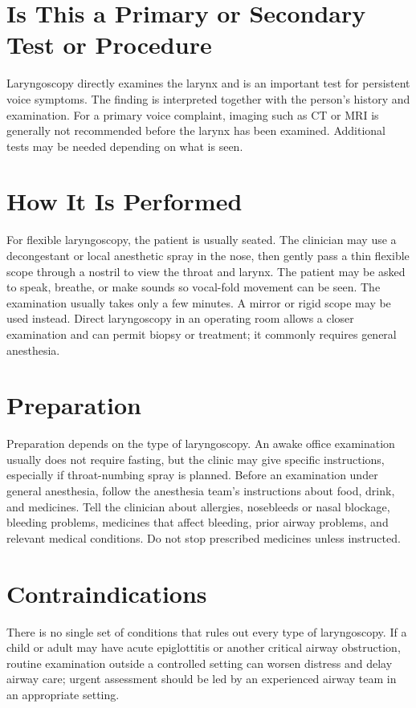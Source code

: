 \section*{Is This a Primary or Secondary Test or Procedure}
Laryngoscopy directly examines the larynx and is an important test for persistent voice symptoms. The finding is interpreted together with the person's history and examination. For a primary voice complaint, imaging such as CT or MRI is generally not recommended before the larynx has been examined. Additional tests may be needed depending on what is seen.

\section*{How It Is Performed}
For flexible laryngoscopy, the patient is usually seated. The clinician may use a decongestant or local anesthetic spray in the nose, then gently pass a thin flexible scope through a nostril to view the throat and larynx. The patient may be asked to speak, breathe, or make sounds so vocal-fold movement can be seen. The examination usually takes only a few minutes. A mirror or rigid scope may be used instead. Direct laryngoscopy in an operating room allows a closer examination and can permit biopsy or treatment; it commonly requires general anesthesia.

\section*{Preparation}
Preparation depends on the type of laryngoscopy. An awake office examination usually does not require fasting, but the clinic may give specific instructions, especially if throat-numbing spray is planned. Before an examination under general anesthesia, follow the anesthesia team's instructions about food, drink, and medicines. Tell the clinician about allergies, nosebleeds or nasal blockage, bleeding problems, medicines that affect bleeding, prior airway problems, and relevant medical conditions. Do not stop prescribed medicines unless instructed.

\section*{Contraindications}
There is no single set of conditions that rules out every type of laryngoscopy. If a child or adult may have acute epiglottitis or another critical airway obstruction, routine examination outside a controlled setting can worsen distress and delay airway care; urgent assessment should be led by an experienced airway team in an appropriate setting.

